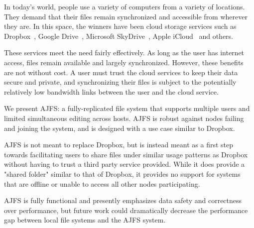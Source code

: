 
In today's world, people use a variety of computers from a variety of locations.
They demand that their files remain synchronized and accessible from wherever
they are. In this space, the winners have been cloud storage services such as
Dropbox~\cite{Dropbox}, Google Drive~\cite{googledrive}, Microsoft
SkyDrive~\cite{skydrive}, Apple iCloud~\cite{icloud} and others.

These services meet the need fairly effectively. As long as the user has
internet access, files remain available and largely synchronized. However, these
benefits are not without cost. A user must trust the cloud services to keep
their data secure and private, and synchronizing their files is subject to the
potentially relatively low bandwidth links between the user and the cloud
service.

We present AJFS: a fully-replicated file system that supports multiple users and
limited simultaneous editing across hosts. AJFS is robust against nodes failing
and joining the system, and is designed with a use case similar to Dropbox.

AJFS is not meant to replace Dropbox, but is instead meant as a first step
towards facilitating users to share files under similar usage patterns as
Dropbox without having to trust a third party service provided. While it does
provide a "shared folder" similar to that of Dropbox, it provides no support for
systems that are offline or unable to access all other nodes participating.

AJFS is fully functional and presently emphasizes data safety and correctness
over performance, but future work could dramatically decrease the performance
gap between local file systems and the AJFS system.

